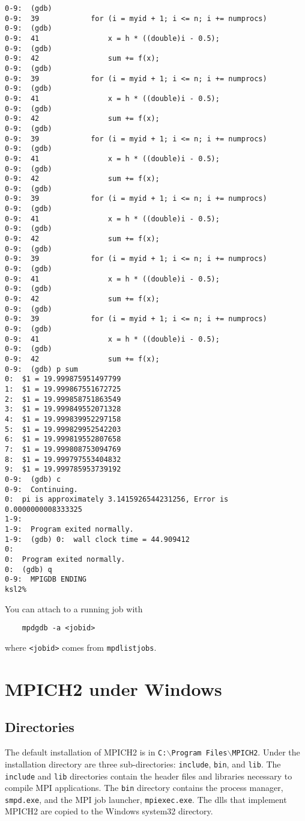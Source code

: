 \documentclass[dvipdfm,11pt]{article}
\begin{document}
\begin{tiny}
\begin{verbatim}
0-9:  (gdb) 
0-9:  39            for (i = myid + 1; i <= n; i += numprocs)
0-9:  (gdb) 
0-9:  41                x = h * ((double)i - 0.5);
0-9:  (gdb) 
0-9:  42                sum += f(x);
0-9:  (gdb) 
0-9:  39            for (i = myid + 1; i <= n; i += numprocs)
0-9:  (gdb) 
0-9:  41                x = h * ((double)i - 0.5);
0-9:  (gdb) 
0-9:  42                sum += f(x);
0-9:  (gdb) 
0-9:  39            for (i = myid + 1; i <= n; i += numprocs)
0-9:  (gdb) 
0-9:  41                x = h * ((double)i - 0.5);
0-9:  (gdb) 
0-9:  42                sum += f(x);
0-9:  (gdb) 
0-9:  39            for (i = myid + 1; i <= n; i += numprocs)
0-9:  (gdb) 
0-9:  41                x = h * ((double)i - 0.5);
0-9:  (gdb) 
0-9:  42                sum += f(x);
0-9:  (gdb) 
0-9:  39            for (i = myid + 1; i <= n; i += numprocs)
0-9:  (gdb) 
0-9:  41                x = h * ((double)i - 0.5);
0-9:  (gdb) 
0-9:  42                sum += f(x);
0-9:  (gdb) 
0-9:  39            for (i = myid + 1; i <= n; i += numprocs)
0-9:  (gdb) 
0-9:  41                x = h * ((double)i - 0.5);
0-9:  (gdb) 
0-9:  42                sum += f(x);
0-9:  (gdb) p sum
0:  $1 = 19.999875951497799
1:  $1 = 19.999867551672725
2:  $1 = 19.999858751863549
3:  $1 = 19.999849552071328
4:  $1 = 19.999839952297158
5:  $1 = 19.999829952542203
6:  $1 = 19.999819552807658
7:  $1 = 19.999808753094769
8:  $1 = 19.999797553404832
9:  $1 = 19.999785953739192
0-9:  (gdb) c
0-9:  Continuing.
0:  pi is approximately 3.1415926544231256, Error is 0.0000000008333325
1-9:  
1-9:  Program exited normally.
1-9:  (gdb) 0:  wall clock time = 44.909412
0:  
0:  Program exited normally.
0:  (gdb) q
0-9:  MPIGDB ENDING
ksl2% 
\end{verbatim}
\end{tiny}
You can attach to a running job with
\begin{verbatim}
    mpdgdb -a <jobid>
\end{verbatim}
where \texttt{<jobid>} comes from \texttt{mpdlistjobs}.

\section{MPICH2 under Windows}
\label{sec:windows}

\subsection{Directories}
\label{sec:windir}

The default installation of MPICH2 is in
\texttt{C:$\backslash$Program Files$\backslash$MPICH2}. Under the installation
directory are three sub-directories: \texttt{include}, \texttt{bin}, and
\texttt{lib}.  The \texttt{include} and \texttt{lib} directories contain
the header files and libraries necessary to compile MPI applications.  
The \texttt{bin} directory contains the process manager, \texttt{smpd.exe},
and the MPI job launcher, \texttt{mpiexec.exe}.  The dlls that implement
MPICH2 are copied to the Windows system32 directory.
\end{document}
